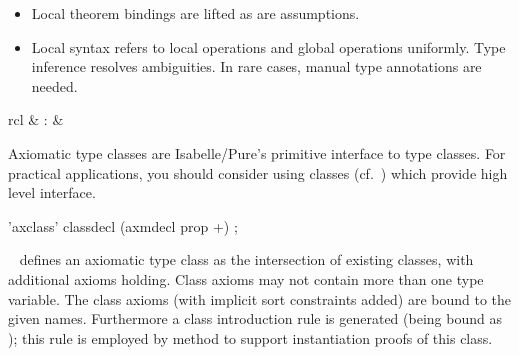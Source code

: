 \begin{isabellebody}
\begin{isamarkuptext}
\begin{itemize}
  \item Local theorem bindings are lifted as are assumptions.

  \item Local syntax refers to local operations  and
  global operations  uniformly.  Type inference
  resolves ambiguities.  In rare cases, manual type annotations are
  needed.
  
  \end{itemize}%
\end{isamarkuptext}%
\isamarkuptrue%
%
\isamarkuptrue%
%
\begin{isamarkuptext}%
\begin{matharray}{rcl}
    \hypertarget{command.axclass}{\hyperlink{command.axclass}{\mbox{}}} & : & 
  \end{matharray}

  Axiomatic type classes are Isabelle/Pure's primitive
  interface to type classes.  For practical
  applications, you should consider using classes
  (cf.~) which provide high level interface.

  \begin{rail}
    'axclass' classdecl (axmdecl prop +)
    ;
  \end{rail}

  \begin{description}
  
  \item \hyperlink{command.axclass}{\mbox{}}~ defines an
  axiomatic type class as the intersection of existing classes, with
  additional axioms holding.  Class axioms may not contain more than
  one type variable.  The class axioms (with implicit sort constraints
  added) are bound to the given names.  Furthermore a class
  introduction rule is generated (being bound as ); this rule is employed by method \hyperlink{method.intro-classes}{\mbox{}} to support instantiation proofs of this class.
  

\end{description}
\end{isamarkuptext}
\end{isabellebody}
